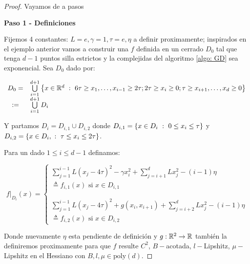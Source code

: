 \begin{proof} Vayamos de a pasos
		
	\medskip
	
	\textbf{Paso 1 - Definiciones}
	
	\medskip
	
	Fijemos 4 constantes: $L=e, \gamma = 1, \tau = e, \eta$ a definir proximamente; inspirados en el ejemplo anterior vamos a construir una $f$ definida en un cerrado $D_0$ tal que tenga $d-1$ puntos silla estrictos y la complejidas del algoritmo \ref{algo: GD} sea exponencial. Sea $D_0$ dado por:
	
	\begin{equation}
	\begin{array}{cl}
	D_ 0 = & \bigcup\limits_{i=1}^{d+1} \left\lbrace x \in {\mathbb{R}}^d ~:~ 6\tau \geq x_1, \dots, x_{i-1} \geq 2\tau; 2\tau \geq x_i \geq 0 ; \tau \geq x_{i+1}, \dots, x_d \geq 0 \right\rbrace  \\
	:= & \bigcup\limits_{i=1}^{d+1}{D_i}
	\end{array}
	\end{equation}
	
	Y partamos $D_i = D_{i,1} \cup D_{i,2}$ donde $D_{i,1} = \left\lbrace x \in D_i ~:~ 0 \leq x_i \leq \tau\right\rbrace$ y $D_{i,2} = \left\lbrace x \in D_i, ~:~ \tau \leq x_i \leq 2\tau\right\rbrace$.
	
	Para un dado $1 \leq i \leq d-1$ definamos:
	
	\begin{equation}
	f\vert_{D_i}(x) = \left\lbrace \begin{array}{l}
	\sum\limits_{j=1}^{i-1}{L \left(x_j - 4\tau\right)^2}  - \gamma x_i^2 + \sum\limits_{j={i+1}}^{d} {L x_j^2 - \left(i-1\right)\eta } \\
	\triangleq f_{i,1}(x) \text{ si } x\in D_{i,1} \\
	\\
	\\
	\sum\limits_{j=1}^{i-1}{L \left(x_j - 4\tau\right)^2}  + g(x_i, x_{i+1})+ \sum\limits_{j={i+2}}^{d} {L x_j^2 - \left(i-1\right)\eta } \\ \triangleq f_{i,2}(x)  \text{ si } x\in D_{i,2}
	\end{array}\right.
	\end{equation}
	
	Donde nuevamente $\eta$ esta pendiente de definici\'on y $g: {\mathbb{R}}^2 \rightarrow {\mathbb{R}}$ tambi\'en la definiremos proximamente para que $f$ resulte $C^2$, $B-$acotada, $l-$Lipshitz, $\mu-$Lipshitz en el Hessiano con $B,l,\mu \in \text{poly}(d)$. 
	

\end{proof}
